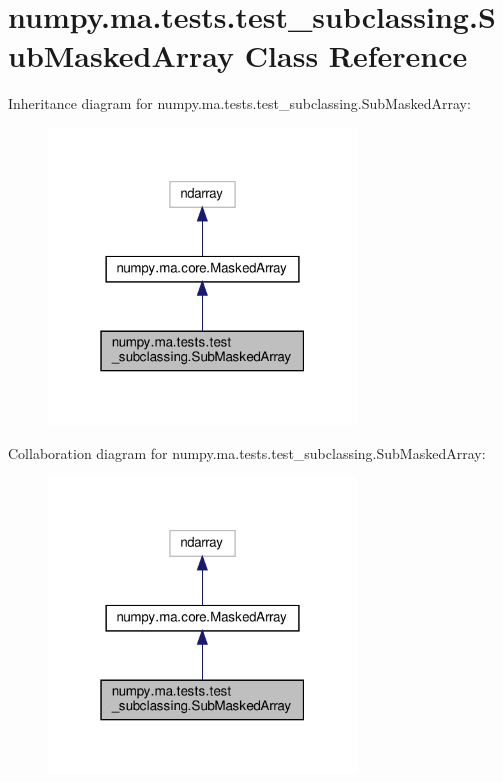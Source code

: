 \hypertarget{classnumpy_1_1ma_1_1tests_1_1test__subclassing_1_1SubMaskedArray}{}\section{numpy.\+ma.\+tests.\+test\+\_\+subclassing.\+Sub\+Masked\+Array Class Reference}
\label{classnumpy_1_1ma_1_1tests_1_1test__subclassing_1_1SubMaskedArray}


Inheritance diagram for numpy.\+ma.\+tests.\+test\+\_\+subclassing.\+Sub\+Masked\+Array\+:
\nopagebreak
\begin{figure}[H]
\begin{center}
\leavevmode
\includegraphics[width=232pt]{classnumpy_1_1ma_1_1tests_1_1test__subclassing_1_1SubMaskedArray__inherit__graph}
\end{center}
\end{figure}


Collaboration diagram for numpy.\+ma.\+tests.\+test\+\_\+subclassing.\+Sub\+Masked\+Array\+:
\nopagebreak
\begin{figure}[H]
\begin{center}
\leavevmode
\includegraphics[width=232pt]{classnumpy_1_1ma_1_1tests_1_1test__subclassing_1_1SubMaskedArray__coll__graph}
\end{center}
\end{figure}
